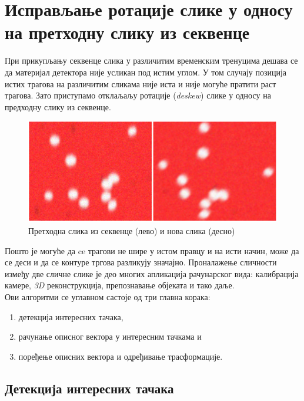 \documentclass[12pt,a4paper,serbian,oneside]{book}
\begin{document}
\section{Исправљање ротације слике у односу на претходну слику из секвенце}

При прикупљању секвенце слика у различитим временским тренуцима дешава се да материјал детектора није усликан под истим углом. У том случају позиција истих трагова на различитим сликама није иста и није могуће пратити раст трагова. Зато приступамо отклаљаљу ротације (\textit{deskew}) слике у односу на предходну слику из секвенце.

\begin{figure}
\begin{center}
\includegraphics[width=150mm]{images/prev+new.png}
\end{center}
\caption{Претходна слика из секвенце (лево) и нова слика (десно)}
\label{fig:otsu}
\end{figure}

Пошто је могуће да ce трагови не шире у истом правцу и на исти начин, може да се деси и да се контуре тргова разликују значајно.  Проналажење сличности између две сличне слике је део многих апликација рачунарског вида: калибрација камере, \textit{3D} реконструкција, препознавање објеката и тако даље. \\

Ови алгоритми се  углавном састоје од три главна корака:
\begin{enumerate}
  \item детекција интересних тачака,
  \item рачунање описног вектора у интересним тачкама и
  \item поређење описних вектора и одређивање трасформације.
\end{enumerate}

\subsection{Детекција интересних тачака}
\end{document}
